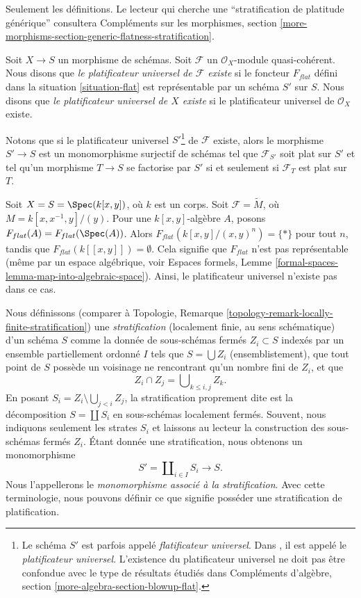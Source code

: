 \noindent
Seulement les définitions. Le lecteur qui cherche une
``stratification de platitude générique'' consultera
Compléments sur les morphismes, section
\ref{more-morphisms-section-generic-flatness-stratification}.

\begin{definition}
\label{definition-flattening}
Soit $X \to S$ un morphisme de schémas.
Soit $\mathcal{F}$ un $\mathcal{O}_X$-module quasi-cohérent.
Nous disons que {\it le platificateur universel de $\mathcal{F}$ existe}
si le foncteur $F_{flat}$ défini dans la situation \ref{situation-flat}
est représentable par un schéma $S'$ sur $S$.
Nous disons que {\it le platificateur universel de $X$ existe}
si le platificateur universel de $\mathcal{O}_X$ existe.
\end{definition}

\noindent
Notons que si le platificateur universel $S'$\footnote{Le schéma $S'$ est parfois
appelé {\it flatificateur universel}. Dans \cite{GruRay}, il est appelé
le {\it platificateur universel}. L'existence du platificateur universel
ne doit pas être confondue avec le type de résultats étudiés dans
Compléments d'algèbre, section \ref{more-algebra-section-blowup-flat}.} de
$\mathcal{F}$ existe, alors le morphisme $S' \to S$ est un monomorphisme
surjectif de schémas tel que $\mathcal{F}_{S'}$ soit plat sur $S'$
et tel qu'un morphisme $T \to S$ se factorise par $S'$ si et seulement si
$\mathcal{F}_T$ est plat sur $T$.

\begin{example}
\label{example-no-universal-flattening}
Soit $X = S = \Spec(k[x, y])$, où $k$ est un corps. Soit
$\mathcal{F} = \widetilde{M}$, où $M = k[x, x^{-1}, y]/(y)$.
Pour une $k[x, y]$-algèbre $A$, posons $F_{flat}(A) = F_{flat}(\Spec(A))$.
Alors $F_{flat}(k[x, y]/(x, y)^n) = \{*\}$ pour tout $n$, tandis que
$F_{flat}(k[[x, y]]) = \emptyset$. Cela signifie que $F_{flat}$ n'est pas
représentable (même par un espace algébrique, voir
Espaces formels, Lemme
\ref{formal-spaces-lemma-map-into-algebraic-space}).
Ainsi, le platificateur universel n'existe pas dans ce cas.
\end{example}

\noindent
Nous définissons (comparer à
Topologie, Remarque \ref{topology-remark-locally-finite-stratification})
une {\it stratification} (localement finie, au sens schématique) d'un schéma $S$
comme la donnée de sous-schémas fermés $Z_i \subset S$ indexés par un
ensemble partiellement ordonné $I$ tels que
$S = \bigcup Z_i$ (ensemblistement), que tout point de $S$ possède
un voisinage ne rencontrant qu'un nombre fini de $Z_i$, et que
$$
Z_i \cap Z_j = \bigcup\nolimits_{k \leq i, j} Z_k.
$$
En posant $S_i = Z_i \setminus \bigcup_{j < i} Z_j$, la stratification
proprement dite est la décomposition $S = \coprod S_i$ en
sous-schémas localement fermés. Souvent, nous indiquons seulement les strates
$S_i$ et laissons au lecteur la construction des sous-schémas fermés $Z_i$.
Étant donnée une stratification, nous obtenons un monomorphisme
$$
S' = \coprod\nolimits_{i \in I} S_i \longrightarrow S.
$$
Nous l'appellerons le {\it monomorphisme associé à la stratification}.
Avec cette terminologie, nous pouvons définir ce que signifie posséder une
stratification de platification.

